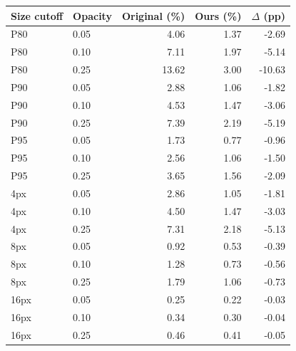 \begin{tabular}{llrrr}
\hline
Size cutoff & Opacity & Original (\%) & Ours (\%) & $\Delta$ (pp) \\
\hline
P80 & 0.05 & 4.06 & 1.37 & -2.69 \\
P80 & 0.10 & 7.11 & 1.97 & -5.14 \\
P80 & 0.25 & 13.62 & 3.00 & -10.63 \\
P90 & 0.05 & 2.88 & 1.06 & -1.82 \\
P90 & 0.10 & 4.53 & 1.47 & -3.06 \\
P90 & 0.25 & 7.39 & 2.19 & -5.19 \\
P95 & 0.05 & 1.73 & 0.77 & -0.96 \\
P95 & 0.10 & 2.56 & 1.06 & -1.50 \\
P95 & 0.25 & 3.65 & 1.56 & -2.09 \\
4px & 0.05 & 2.86 & 1.05 & -1.81 \\
4px & 0.10 & 4.50 & 1.47 & -3.03 \\
4px & 0.25 & 7.31 & 2.18 & -5.13 \\
8px & 0.05 & 0.92 & 0.53 & -0.39 \\
8px & 0.10 & 1.28 & 0.73 & -0.56 \\
8px & 0.25 & 1.79 & 1.06 & -0.73 \\
16px & 0.05 & 0.25 & 0.22 & -0.03 \\
16px & 0.10 & 0.34 & 0.30 & -0.04 \\
16px & 0.25 & 0.46 & 0.41 & -0.05 \\
\hline
\end{tabular}
